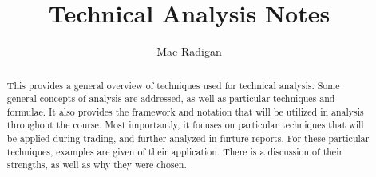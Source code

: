 \documentclass{report}
\begin{document}
\title{Technical Analysis Notes}
\author{Mac Radigan}
\date{} %
\maketitle
\begin{abstract}\centering
This provides a general overview of techniques used for technical analysis.  Some general concepts of analysis are addressed, as well as particular techniques and formulae.  It also provides the framework and notation that will be utilized in analysis throughout the course.  Most importantly, it focuses on particular techniques that will be applied during trading, and further analyzed in furture reports.  For these particular techniques, examples are given of their application.  There is a discussion of their strengths, as well as why they were chosen.
\end{abstract}
\tableofcontents
\listoffigures




%


\appendix
\end{document}
